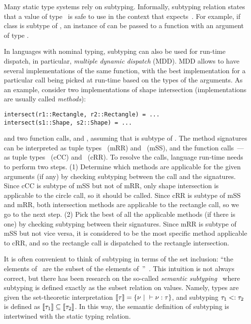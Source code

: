 Many static type systems rely on subtyping.
Informally, subtyping relation  states that
a value of type~ is safe to use 
in the context that expects~.
For example, if class  is subtype of ,
an instance of  can be passed to a function
with an argument of type .

In languages with nominal typing, subtyping can also be used for run-time
dispatch, in particular, \emph{multiple dynamic dispatch} (MDD).
MDD allows to have several implementations of the same function,
with the best implementation for a particular call being picked 
at run-time based on the types of the arguments.
As an example, consider two implementations of shape intersection
(implementations are usually called \emph{methods}):
\begin{verbatim}
intersect(r1::Rectangle, r2::Rectangle) = ...
intersect(s1::Shape, s2::Shape) = ...
\end{verbatim}
and two function calls, 
and ,
assuming that  is subtype of .
The method signatures can be interpreted as tuple types
~(mRR) 
and ~(mSS),
and the function calls~--- as tuple types 
~(cCC) 
and ~(cRR).
To resolve the calls, language run-time needs to perform two steps.
(1) Determine which methods are applicable for the given arguments (if any)
by checking subtyping between the call and the signatures.
Since cCC is subtype of mSS but not of mRR, only shape intersection
is applicable to the circle call, so it should be called.
Since cRR is subtype of mSS and mRR, both intersection methods 
are applicable to the rectangle call, so we go to the next step.
(2) Pick the best of all the applicable methods (if there is one) 
by checking subtyping between their signatures.
Since mRR is subtype of mSS but not vice versa, it is considered to be
the most specific method applicable to cRR, 
and so the rectangle call is dispatched to the rectangle intersection.

It is often convenient to think of subtyping 
in terms of the set inclusion: ``the elements of~ are the subset
of the elements of~''~\cite{TAPL}.
This intuition is not always correct, but there has been research on
the so-called \emph{semantic subtyping}~\cite{?} where subtyping is defined
exactly as the subset relation on values.
Namely, types are given the set-theoretic interpretation
$\llbracket \tau \rrbracket = \{\nu ~\vert~ \vdash \nu : \tau \}$, 
and subtyping $\tau_1 <: \tau_2$ is defined 
as $\llbracket \tau_1 \rrbracket \subseteq \llbracket \tau_2 \rrbracket$.
In this way, the semantic definition of subtyping is intertwined with 
the static typing relation.

